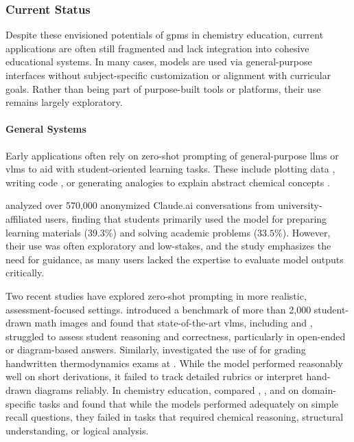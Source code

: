 \subsubsection{Current Status}

Despite these envisioned potentials of \glspl{gpm} in chemistry education, current applications are often still fragmented and lack integration into cohesive educational systems. 
In many cases, models are used via general-purpose interfaces without subject-specific customization or alignment with curricular goals. 
Rather than being part of purpose-built tools or platforms, their use remains largely exploratory.

\paragraph{General Systems}
Early applications often rely on zero-shot prompting of general-purpose \glspl{llm} or \glspl{vlm} to aid with student-oriented learning tasks. 
These include plotting data \autocite{Subasinghe2025}, writing code \autocite{Tsai2023}, or generating analogies to explain abstract chemical concepts \autocite{shao2025unlocking}. 

\textcite{handa2025education} analyzed over 570,000 anonymized Claude.ai conversations from university-affiliated users, finding that students primarily used the model for preparing learning materials ($39.3\%$) and solving academic problems ($33.5\%$). 
However, their use was often exploratory and low-stakes, and the study emphasizes the need for guidance, as many users lacked the expertise to evaluate model outputs critically.

Two recent studies have explored zero-shot prompting in more realistic, assessment-focused settings. \textcite{baral2025drawedumath0} introduced a benchmark of more than 2,000 student-drawn math images and found that state-of-the-art \glspl{vlm}, including  and , struggled to assess student reasoning and correctness, particularly in open-ended or diagram-based answers. 
Similarly, \textcite{Kortemeyer2024} investigated the use of  for grading handwritten thermodynamics exams at . While the model performed reasonably well on short derivations, it failed to track detailed rubrics or interpret hand-drawn diagrams reliably. 
In chemistry education, \textcite{kharchenko2024advantages} compared , , and  on domain-specific tasks and found that while the models performed adequately on simple recall questions, they failed in tasks that required chemical reasoning, structural understanding, or logical analysis.

